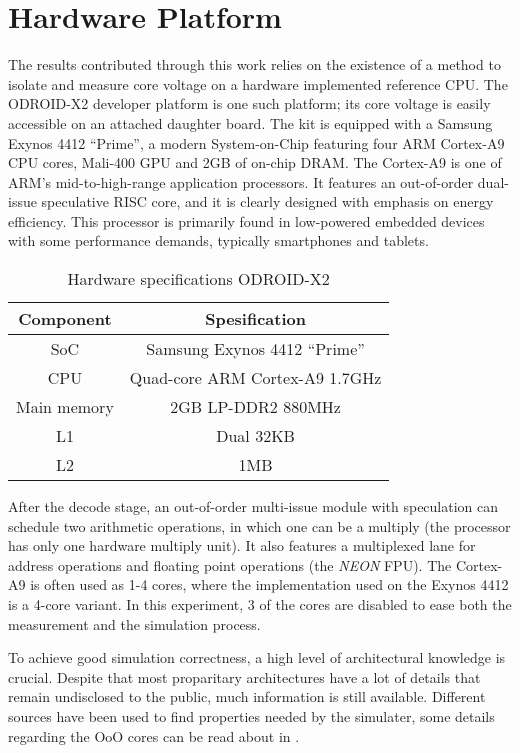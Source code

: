 \section{Hardware Platform}

The results contributed through this work relies on the existence of a method to
isolate and measure core voltage on a hardware implemented reference CPU. The
ODROID-X2 developer platform \cite{hardkernelodroidx2} is one such platform; its
core voltage is easily accessible on an attached daughter board. The kit is
equipped with a Samsung Exynos 4412 ``Prime'', a modern System-on-Chip featuring
four ARM Cortex-A9 CPU cores, Mali-400 GPU and 2GB of on-chip DRAM. The
Cortex-A9 is one of ARM's mid-to-high-range application processors. It features
an out-of-order dual-issue speculative RISC core, and it is clearly designed
with emphasis on energy efficiency. This processor is primarily found in
low-powered embedded devices with some performance demands, typically
smartphones and tablets.

    \begin{table}
        \centering
        \begin{tabular}{|c|c|}
            \hline
            Component   & Spesification\\
            \hline
            SoC         & Samsung Exynos 4412 ``Prime'' \\
            CPU         & Quad-core ARM Cortex-A9 1.7GHz \\
            Main memory & 2GB LP-DDR2 880MHz \\
            L1          & Dual 32KB \\
            L2          & 1MB \\
            \hline
        \end{tabular}
        \caption{Hardware specifications ODROID-X2}
        \label{tab:hwspecx2}
    \end{table}

After the decode stage, an out-of-order multi-issue module with speculation can
schedule two arithmetic operations, in which one can be a multiply (the
processor has only one hardware multiply unit). It also features a multiplexed lane
for address operations and floating point operations (the \emph{NEON} FPU). The
Cortex-A9 is often used as 1-4 cores\cite{armsite}, where the implementation
used on the Exynos 4412 is a 4-core variant\cite{somesite}. In this experiment,
3 of the cores are disabled to ease both the measurement and the simulation
process.

To achieve good simulation correctness, a high level of architectural knowledge
is crucial. Despite that most proparitary architectures have a lot of details
that remain undisclosed to the public, much information is still available.
Different sources have been used to find properties needed by the simulater,
some details regarding the OoO cores can be read about in
\cite{blem2013detailed}.
